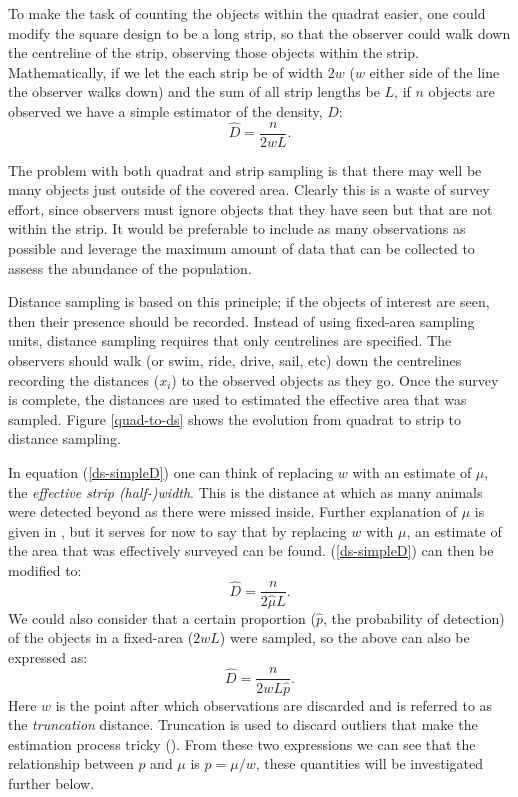 To make the task of counting the objects within the quadrat easier, one could modify the square design to be a long strip, so that the observer could walk down the centreline of the strip, observing those objects within the strip. Mathematically, if we let the each strip be of width $2w$ ($w$ either side of the line the observer walks down) and the sum of all strip lengths be $L$, if $n$ objects are observed we have a simple estimator of the density, $D$:
\begin{equation}
\hat{D}=\frac{n}{2wL}.
\label{ds-simpleD}
\end{equation}

The problem with both quadrat and strip sampling is that there may well be many objects just outside of the covered area. Clearly this is a waste of survey effort, since observers must ignore objects that they have seen but that are not within the strip. It would be preferable to include as many observations as possible and leverage the maximum amount of data that can be collected to assess the abundance of the population.

Distance sampling is based on this principle; if the objects of interest are seen, then their presence should be recorded. Instead of using fixed-area sampling units, distance sampling requires that only centrelines are specified. The observers should walk (or swim, ride, drive, sail, etc) down the centrelines recording the distances ($x_i$) to the observed objects as they go. Once the survey is complete, the distances are used to estimated the effective area that was sampled. Figure \ref{quad-to-ds} shows the evolution from quadrat to strip to distance sampling.

In equation (\ref{ds-simpleD}) one can think of replacing $w$ with an estimate of $\mu$, the \textit{effective strip (half-)width}. This is the distance at which as many animals were detected beyond as there were missed inside. Further explanation of $\mu$ is given in , but it serves for now to say that by replacing $w$ with $\mu$, an estimate of the area that was effectively surveyed can be found. (\ref{ds-simpleD}) can then be modified to:
\begin{equation}
\hat{D}=\frac{n}{2\hat{\mu}L}.
\label{ds-D}
\end{equation}
We could also consider that a certain proportion ($\hat{p}$, the probability of detection) of the objects in a fixed-area ($2wL$) were sampled, so the above can also be expressed as:
\begin{equation*}
\hat{D}=\frac{n}{2wL\hat{p}}.
\end{equation*}
Here $w$ is the point after which observations are discarded and is referred to as the \textit{truncation} distance. Truncation is used to discard outliers that make the estimation process tricky (\cite[pp. 15-16]{IDS}). From these two expressions we can see that the relationship between $p$ and $\mu$ is $p=\mu/w$, these quantities will be investigated further below.

